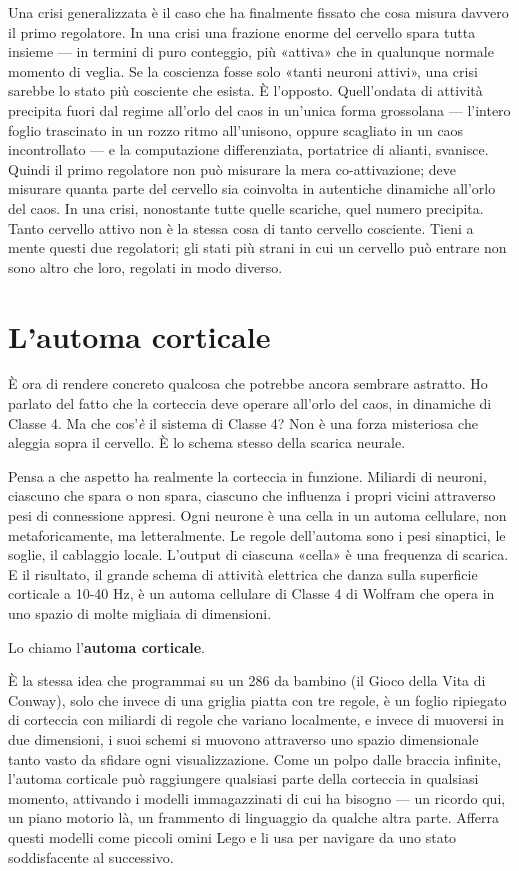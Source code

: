 \documentclass[11pt, twoside, openright]{book}
\begin{document}
Una crisi generalizzata è il caso che ha finalmente fissato che cosa misura davvero il primo regolatore. In una crisi una frazione enorme del cervello spara tutta insieme --- in termini di puro conteggio, più «attiva» che in qualunque normale momento di veglia. Se la coscienza fosse solo «tanti neuroni attivi», una crisi sarebbe lo stato più cosciente che esista. È l'opposto. Quell'ondata di attività precipita fuori dal regime all'orlo del caos in un'unica forma grossolana --- l'intero foglio trascinato in un rozzo ritmo all'unisono, oppure scagliato in un caos incontrollato --- e la computazione differenziata, portatrice di alianti, svanisce. Quindi il primo regolatore non può misurare la mera co-attivazione; deve misurare quanta parte del cervello sia coinvolta in autentiche dinamiche all'orlo del caos. In una crisi, nonostante tutte quelle scariche, quel numero precipita. Tanto cervello attivo non è la stessa cosa di tanto cervello cosciente. Tieni a mente questi due regolatori; gli stati più strani in cui un cervello può entrare non sono altro che loro, regolati in modo diverso.

\section*{L'automa corticale}

È ora di rendere concreto qualcosa che potrebbe ancora sembrare astratto. Ho parlato del fatto che la corteccia deve operare all'orlo del caos, in dinamiche di Classe 4. Ma che cos'\textit{è} il sistema di Classe 4? Non è una forza misteriosa che aleggia sopra il cervello. È lo schema stesso della scarica neurale.

Pensa a che aspetto ha realmente la corteccia in funzione. Miliardi di neuroni, ciascuno che spara o non spara, ciascuno che influenza i propri vicini attraverso pesi di connessione appresi. Ogni neurone è una cella in un automa cellulare, non metaforicamente, ma letteralmente. Le regole dell'automa sono i pesi sinaptici, le soglie, il cablaggio locale. L'output di ciascuna «cella» è una frequenza di scarica. E il risultato, il grande schema di attività elettrica che danza sulla superficie corticale a 10-40 Hz, è un automa cellulare di Classe 4 di Wolfram che opera in uno spazio di molte migliaia di dimensioni.

Lo chiamo l'\textbf{automa corticale}.

È la stessa idea che programmai su un 286 da bambino (il Gioco della Vita di Conway), solo che invece di una griglia piatta con tre regole, è un foglio ripiegato di corteccia con miliardi di regole che variano localmente, e invece di muoversi in due dimensioni, i suoi schemi si muovono attraverso uno spazio dimensionale tanto vasto da sfidare ogni visualizzazione. Come un polpo dalle braccia infinite, l'automa corticale può raggiungere qualsiasi parte della corteccia in qualsiasi momento, attivando i modelli immagazzinati di cui ha bisogno --- un ricordo qui, un piano motorio là, un frammento di linguaggio da qualche altra parte. Afferra questi modelli come piccoli omini Lego e li usa per navigare da uno stato soddisfacente al successivo.
\end{document}
